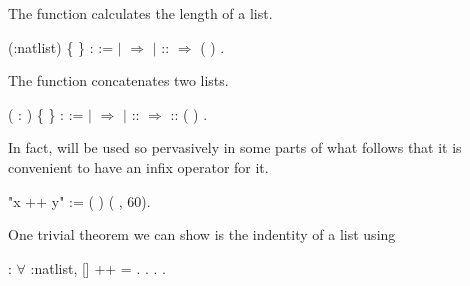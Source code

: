\documentclass[12pt]{report}
\begin{document}
The  function calculates the length of a
    list. \begin{coqdoccode}
\coqdocemptyline
\coqdocnoindent
{}  (:natlist) \{ \} :  := \coqdoceol
\coqdocindent{1.00em}
  \coqdoceol
\coqdocindent{1.00em}
\ensuremath{|}  \ensuremath{\Rightarrow} \coqdoceol
\coqdocindent{1.00em}
\ensuremath{|}  ::  \ensuremath{\Rightarrow}  ( )\coqdoceol
\coqdocindent{1.00em}
.\coqdoceol
\coqdocemptyline
\end{coqdoccode}
The  function concatenates two lists. \begin{coqdoccode}
\coqdocemptyline
\coqdocnoindent
{}  (  : ) \{ \} :  := \coqdoceol
\coqdocindent{1.00em}
  \coqdoceol
\coqdocindent{1.00em}
\ensuremath{|}     \ensuremath{\Rightarrow} \coqdoceol
\coqdocindent{1.00em}
\ensuremath{|}  ::  \ensuremath{\Rightarrow}  :: (  )\coqdoceol
\coqdocindent{1.00em}
.\coqdoceol
\coqdocemptyline
\end{coqdoccode}
In fact,  will be used so pervasively in
    some parts of what follows that it is convenient to
    have an infix operator for it. \begin{coqdoccode}
\coqdocemptyline
\coqdocnoindent
{} "x ++ y" := (  ) \coqdoceol
\coqdocindent{10.50em}
( ,   60).\coqdoceol
\coqdocemptyline
\end{coqdoccode}
One trivial theorem we can show is the indentity of a list using  \begin{coqdoccode}
\coqdocnoindent
{}  : \ensuremath{\forall} :natlist,\coqdoceol
\coqdocindent{1.00em}
[] ++  = .\coqdoceol
\coqdocnoindent
{}.\coqdoceol
\coqdocindent{1.50em}
. .\coqdoceol
\coqdocemptyline
\end{coqdoccode}
\end{document}
